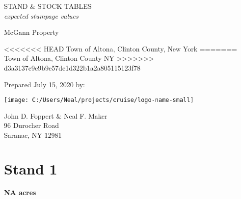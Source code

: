 \documentclass[landscape]{article}
\author{}
\date{\vspace{-2.5em}}
\begin{document}
\captionsetup[table]{labelformat=empty}
\captionsetup{justification=raggedright,singlelinecheck=false}

\vspace*{23pt}

\huge STAND \& STOCK TABLES\\
\large \emph{expected stumpage values}

\vspace{18pt}

\LARGE McGann Property

\vspace{16pt}

\textless{}\textless{}\textless{}\textless{}\textless{}\textless{}\textless{}
HEAD \Large Town of Altona, Clinton County, New York ======= \Large Town
of Altona, Clinton County NY
\textgreater{}\textgreater{}\textgreater{}\textgreater{}\textgreater{}\textgreater{}\textgreater{}
d3a3137c9e9b9e57de1d322b1a2a805115123f78

\vspace{120pt}

\large Prepared July 15, 2020 by:

\vspace{20pt}

\texttt{[image: C:/Users/Neal/projects/cruise/logo-name-small]}

\normalsize John D. Foppert \& Neal F. Maker\\
96 Durocher Road\\
Saranac, NY 12981

\pagebreak
{}

\section{Stand 1}\label{stand-1}

\textbf{NA acres}
\end{document}
